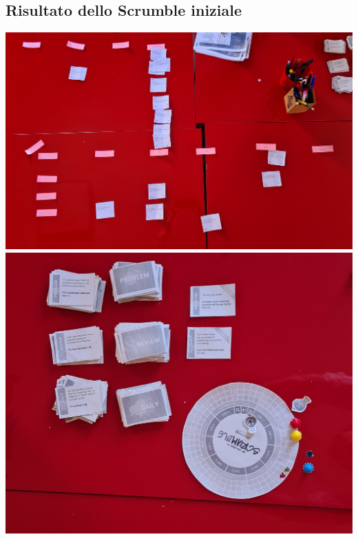 \documentclass{article}
\begin{document}
\subsection{Risultato dello Scrumble iniziale}

\includegraphics[width=\textwidth]{scrumble}
\includegraphics[width=\textwidth]{scrumble-bis}
\end{document}
